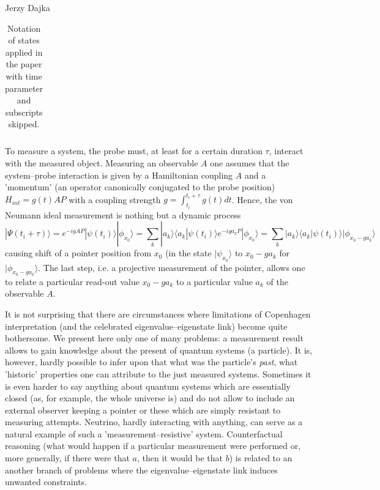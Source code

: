 \begin{artengenv}{Jerzy Dajka}
\begin{table}[ht]
\begin{tabular}{|l||l|}
\end{tabular}
\caption{\label{tabx} Notation of states applied in the paper with time parameter and subscripts skipped.}
\end{table}
  To measure a system, the probe must, at least for a certain duration $\tau$, interact with the measured object. Measuring an observable $A$ one assumes that the system--probe interaction is given by a Hamiltonian coupling $A$ and a 'momentum' (an operator canonically conjugated to the  probe position) 
  \mbox{$H_{int}=g(t)AP$} with a coupling strength $g=\int_{t_i}^{t_i+\tau} g(t)dt$. 
  Hence, the von Neumann ideal measurement is nothing but a dynamic process 
     \begin{equation}\label{ideal}
    |\Psi(t_i+\tau)\rangle=e^{-igAP}|\psi(t_i)\rangle|\phi_{x_0}\rangle=
        \sum_k|a_k\rangle\langle a_k|\psi(t_i)\rangle e^{-iga_k P}|\phi_{x_0}\rangle=\sum_k|a_k\rangle\langle a_k|\psi(t_i)\rangle|\phi_{x_0-ga_k}\rangle \end{equation}
causing shift of a pointer position from $x_0$ (in the state $|\psi_{x_0}\rangle$ to $x_0-ga_k$ for $|\phi_{x_0-ga_k}\rangle$. The last step, i.e. a projective measurement of the pointer, allows one to relate a particular  read-out value $x_0-ga_k$ to a particular value $a_k$ of the observable $A$. 

It is not surprising that there are circumstances where  limitations of Copenhagen interpretation (and the celebrated eigenvalue--eigenstate link) become quite bothersome. We present here only one of many problems: 
a measurement result allows to gain knowledge about the present of quantum systems (a particle). It is, however, hardly possible to infer upon that what was the particle's {\it past}, what 'historic' properties one can attribute to the just measured systems. Sometimes  it is even harder to say anything about  quantum systems which are essentially closed (as, for example, the whole universe is) and do not allow to include an external observer keeping a pointer or these which are simply resistant to measuring attempts. Neutrino, hardly interacting with anything, can serve as a natural example of such a 'measurement--resistive' system. Counterfactual reasoning  (what would happen if a particular measurement were performed  or, more generally,  if there were that $a$, then it would be that $b$) is related to an another branch of problems where the eigenvalue--eigenstate link induces unwanted constraints. 


\end{artengenv}
